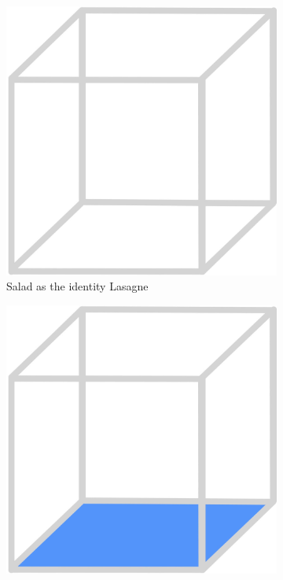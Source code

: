 \documentclass{beamer}
\begin{document}
\begin{frame}
    \begin{figure}
        \begin{subfigure}{.24\textwidth}
          \centering
          \includegraphics[width=\linewidth]{salad/29_salad.jpg}
          \caption{\label{fig:salad-lasagne}Salad as the identity Lasagne}
        \end{subfigure}
        \begin{subfigure}{.24\textwidth}
          \centering
          \includegraphics[width=\linewidth]{toast/16_toast.jpg}

\end{subfigure}
\end{figure}
\end{frame}
\end{document}
